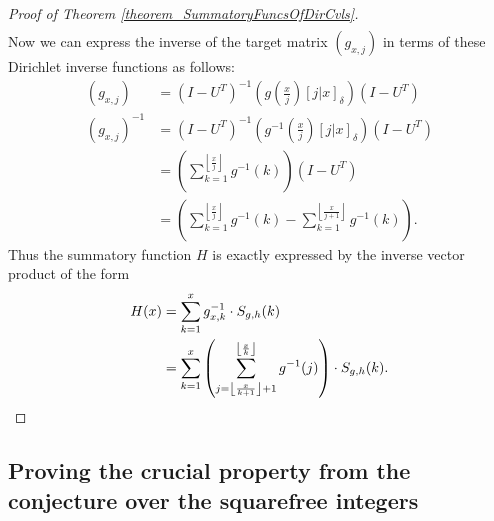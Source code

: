 \documentclass[11pt,reqno,a4letter]{article}
\numberwithin{figure}{section}
\numberwithin{table}{section}
\newcommand{\Iverson}[1]{\ensuremath{\left[#1\right]_{\delta}}}
\newcommand{\floor}[1]{\left\lfloor #1 \right\rfloor}
\theoremstyle{plain}
\numberwithin{theorem}{section}
\theoremstyle{definition}
\begin{document}
\begin{proof}[Proof of Theorem \ref{theorem_SummatoryFuncsOfDirCvls}]
\begin{align*}
\end{align*} 
Now we can express the inverse of the target matrix $(g_{x,j})$ in terms of these Dirichlet inverse functions 
as follows: 
\begin{align*} 
(g_{x,j}) & = (I-U^{T})^{-1} \left(g\left(\frac{x}{j}\right) \Iverson{j|x}\right) (I-U^{T}) \\ 
(g_{x,j})^{-1} & = (I-U^{T})^{-1} \left(g^{-1}\left(\frac{x}{j}\right) \Iverson{j|x}\right) (I-U^{T}) \\ 
     & = \left(\sum_{k=1}^{\floor{\frac{x}{j}}} g^{-1}(k)\right) (I-U^{T}) \\ 
     & = \left(\sum_{k=1}^{\floor{\frac{x}{j}}} g^{-1}(k) - \sum_{k=1}^{\floor{\frac{x}{j+1}}} g^{-1}(k)\right). 
\end{align*} 
Thus the summatory function $H$ is exactly expressed by the inverse vector product of the form 
\begin{align*} 
H(x) & = \sum_{k=1}^x g_{x,k}^{-1} \cdot S_{g,h}(k) \\ 
     & = \sum_{k=1}^x \left(\sum_{j=\floor{\frac{x}{k+1}}+1}^{\floor{\frac{x}{k}}} g^{-1}(j)\right) \cdot S_{g,h}(k). 
     \qedhere
\end{align*} 
\end{proof} 

\subsection{Proving the crucial property from the conjecture over the squarefree integers} 
\end{document}
